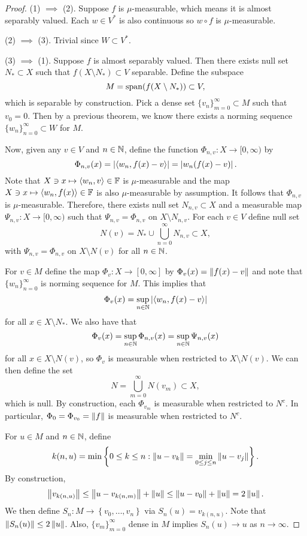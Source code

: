 \documentclass[a4paper]{article}
\renewcommand{\cupinfn}{\bigcup_{n=0}^\infty}
\renewcommand{\seqinfn}[1]{\{ #1 \}_{n=0}^\infty}
\renewcommand{\cupinfm}{\bigcup_{m=0}^\infty}
\renewcommand{\seqinfm}[1]{\{ #1 \}_{m=0}^\infty}
\begin{document}
\begin{proof}
  (1) $\implies$ (2). Suppose $f$ is $\mu$-measurable,
  which means it is almost separably valued.
  Each $w \in V^*$ is also continuous so
  $w \circ f$ is $\mu$-measurable.

  (2) $\implies$ (3). Trivial since $W \subset V^*$.

  (3) $\implies$ (1). Suppose $f$ is almost separably valued.
  Then there exists null set $N_* \subset X$ such that
  $f(X \setminus N_*) \subset V$ separable. Define the subspace
  \[
  M = \operatorname{span}(f(X \setminus N_*)) \subset V,
  \]
  which is separable by construction. Pick a dense
  set $\seqinfm{v_n} \subset M$ such that $v_0 = 0$.
  Then by a previous theorem, we know there exists
  a norming sequence $\seqinfn{w_n} \subset W$ for $M$.

  Now, given any $v \in V$ and $n \in \mathbb{N}$, define
  the function $\Phi_{n, v} : X \to [0, \infty)$
  by
  \[
  \Phi_{n, v}(x) = \left\lvert \left\langle w_n, f(x) - v \right\rangle\right\rvert
  = \left\lvert w_n(f(x) - v)\right\rvert.
  \]
  Note that $X \ni x \mapsto \left\langle w_n, v \right\rangle \in \mathbb{F}$ is
  $\mu$-measurable and the map $X \ni x \mapsto
  \left\langle w_n, f(x) \right\rangle \in \mathbb{F}$ is also $\mu$-measurable
  by assumption. It follows that
  $\Phi_{n, v}$ is $\mu$-measurable. Therefore,
  there exists null set $N_{n, v} \subset X$ and
  a measurable map $\Psi_{n, v} : X \to [0, \infty)$
  such that $\Psi_{n, v} = \Phi_{n, v}$ on $X \setminus
  N_{n, v}$. For each $v \in V$ define null set
  \[
  N(v) = N_* \cup \cupinfn N_{n, v} \subset X,
  \]
  with $\Psi_{n, v} = \Phi_{n, v}$ on $X \setminus N(v)$
  for all $n \in \mathbb{N}$.

  For $v \in M$ define the map $\Phi_v : X \to [0, \infty]$
  by $\Phi_v(x) = \left\lVert f(x) - v\right\rVert$ and note that
  $\seqinfn{w_n}$ is norming sequence for $M$.
  This implies that
  \[
  \Phi_v(x) = \sup_{n \in \mathbb{N}} \left\lvert \left\langle w_n, f(x) - v \right\rangle\right\rvert
  \]
  for all $x \in X \setminus N_*$. We also have that
  \[
  \Phi_v(x) = \sup_{n \in \mathbb{N}} \Phi_{n, v}(x)
  = \sup_{n \in \mathbb{N}} \Psi_{n, v}(x)
  \]
  for all $x \in X \setminus N(v)$, so $\Phi_v$
  is measurable when restricted to $X \setminus N(v)$.
  We can then define the set
  \[
  N = \cupinfm N(v_m) \subset X,
  \]
  which is null. By construction, each $\Phi_{v_m}$
  is measurable when restricted to $N^c$.
  In particular, $\Phi_0 = \Phi_{v_0} = \left\lVert f\right\rVert$
  is measurable when restricted to $N^c$.

  For $u \in M$ and $n \in \mathbb{N}$, define
  \[
  k(n, u) = \min \left\{ 0 \leq k \leq n :
  \left\lVert u - v_k\right\rVert = \min_{0 \leq j \leq n}
  \left\lVert u - v_j\right\rVert \right\}.
  \]
  By construction,
  \[
  \left\lVert v_{k(n, u)}\right\rVert
  \leq \left\lVert u - v_{k(n, m)}\right\rVert + \left\lVert u\right\rVert
  \leq \left\lVert u - v_0\right\rVert + \left\lVert u\right\rVert
  = 2\left\lVert u\right\rVert.
  \]
  We then define $S_n: M \to \left\{ v_0, \dots, v_n
  \right\}$ via $S_n(u) = v_{k(n, u)}$. Note that
  $\left\lVert S_n(u)\right\rVert \leq 2 \left\lVert u\right\rVert$. Also,
  $\seqinfm{v_m}$ dense in $M$ implies
  $S_n(u) \to u$ as $n \to \infty$.


\end{proof}
\end{document}
